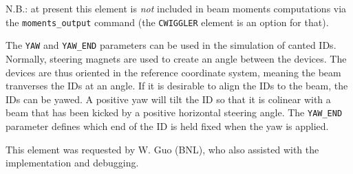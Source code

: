 N.B.: at present this element is {\em not} included in beam moments
computations via the \verb|moments_output| command (the \verb|CWIGGLER| element
is an option for that).

The \verb|YAW| and \verb|YAW_END| parameters can be used in the simulation of canted IDs.
Normally, steering magnets are used to create an angle between the devices.
The devices are thus oriented in the reference coordinate system, meaning the beam tranverses
the IDs at an angle.
If it is desirable to align the IDs to the beam, the IDs can be yawed. A positive yaw will
tilt the ID so that it is colinear with a beam that has been kicked by a positive horizontal
steering angle.
The \verb|YAW_END| parameter defines which end of the ID is held fixed when the yaw is applied.

This element was requested by W. Guo (BNL), who also assisted with the
implementation and debugging.

